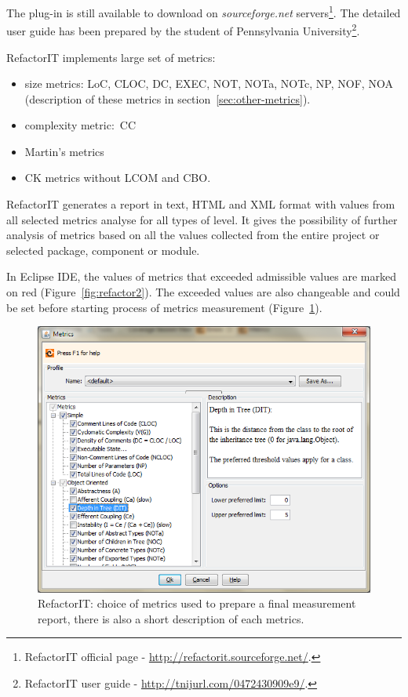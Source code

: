 The plug-in is still available to download on \textit{sourceforge.net} servers\footnote{RefactorIT official page - \url{http://refactorit.sourceforge.net/}.}. The detailed user guide has been prepared by the student of Pennsylvania University\footnote{RefactorIT user guide - \url{http://tnijurl.com/0472430909e9/}.}.  

RefactorIT implements large set of metrics:
\begin{itemize}
\item size metrics: \ac{LoC}, \ac{CLOC}, \ac{DC}, \ac{EXEC}, \ac{NOT}, \ac{NOTa}, \ac{NOTc}, \ac{NP}, \ac{NOF}, \ac{NOA} (description of these metrics in section~\ref{sec:other-metrics}).
\item complexity metric:~\ac{CC}
\item Martin's metrics
\item \ac{CK metrics} without \ac{LCOM} and \ac{CBO}.
\end{itemize}
 
RefactorIT generates a report in text, HTML and XML format with values from all selected metrics analyse for all types of level. It gives the possibility of further analysis of metrics based on all the values collected from the entire project or selected package, component or module. 
 
In Eclipse IDE, the values of metrics that  exceeded admissible values are marked on red (Figure~\ref{fig:refactor2}). The exceeded values are also changeable and could be set before starting process of metrics measurement (Figure~\ref{fig:refactor1}). 
 
\begin{figure}[h!]
 	\centering
 	 \includegraphics[scale=0.6]{img/refactorit1.png} 
 	\caption{RefactorIT: choice of metrics used to prepare a final measurement report, there is also a short description of each metrics.}		
 	\label{fig:refactor1}
 \end{figure} 

